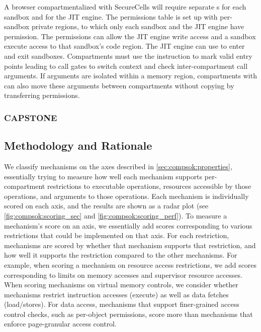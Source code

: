 A browser compartmentalized with SecureCells will require separate
\secdiv{}s for each sandbox and for the JIT engine.
The permissions table is set up with per-sandbox private regions, to which
only each sandbox and the JIT engine have permission.
The permissions can allow the JIT engine write access and a sandbox
execute access to that sandbox's code region.
The JIT engine can use  to enter and exit sandboxes.
Compartments must use the  instruction to mark valid entry points
leading to call gates to switch context and check inter-compartment call
arguments.
If arguments are isolated within a memory region, compartments with 
\seccells can also move these arguments between compartments without copying
by transferring permissions.

\subsubsection{CAPSTONE}

\subsection{Methodology and Rationale}
\label{sec:compsok:methodology}
We classify mechanisms on the axes described in 
\autoref{sec:compsok:properties}, essentially trying to measure how well 
each mechanism supports per-compartment restrictions to executable operations,
resources accessible by those operations, and arguments to those operations.
Each mechanism is individually scored on each axis, and the results are shown
as a radar plot (see \autoref{fig:compsok:scoring_sec} and 
\autoref{fig:compsok:scoring_perf}).
To measure a mechanism's score on an axis, we essentially add scores 
corresponding to various restrictions that could be implemented on that axis.
For each restriction, mechanisms are scored by whether that mechanism supports
that restriction, and how well it supports the restriction compared to the 
other mechanisms.
For example, when scoring a mechanism on resource access restrictions, we
add scores corresponding to limits on memory accesses and supervisor resource
accesses.
When scoring mechanisms on virtual memory controls, we consider whether
mechanisms restrict instruction accesses (execute) as well as 
data fetches (load/stores).
For data access, mechanisms that support finer-grained access control checks, 
such as per-object permissions, score more than mechanisms that enforce 
page-granular access control.

